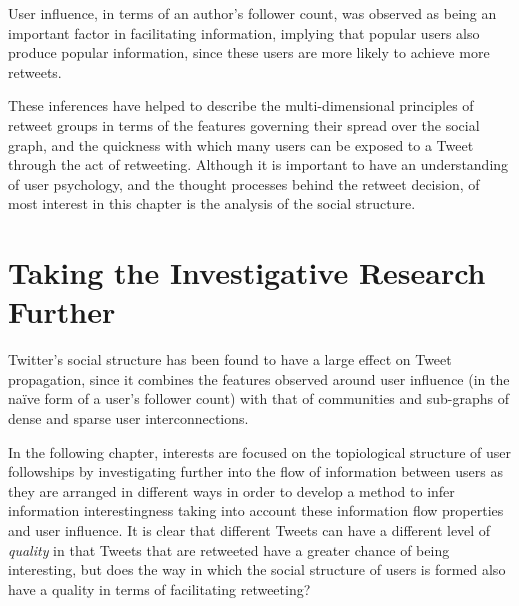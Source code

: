 User influence, in terms of an author's follower count, was observed as being an important factor in facilitating information, implying that popular users also produce popular information, since these users are more likely to achieve more retweets.

These inferences have helped to describe the multi-dimensional principles of retweet groups in terms of the features governing their spread over the social graph, and the quickness with which many users can be exposed to a Tweet through the act of retweeting. Although it is important to have an understanding of user psychology, and the thought processes behind the retweet decision, of most interest in this chapter is the analysis of the social structure.


\section{Taking the Investigative Research Further}
Twitter's social structure has been found to have a large effect on Tweet propagation, since it combines the features observed around user influence (in the naïve form of a user's follower count) with that of communities and sub-graphs of dense and sparse user interconnections.

In the following chapter, interests are focused on the topiological structure of user followships by investigating further into the flow of information between users as they are arranged in different ways in order to develop a method to infer information interestingness taking into account these information flow properties and user influence. It is clear that different Tweets can have a different level of \textit{quality} in that Tweets that are retweeted have a greater chance of being interesting, but does the way in which the social structure of users is formed also have a quality in terms of facilitating retweeting?


